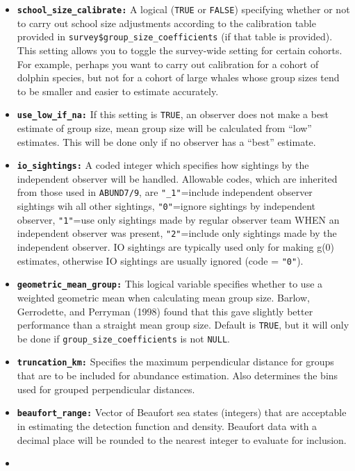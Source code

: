 \documentclass[
]{book}
\begin{document}
\begin{itemize}
\item
  \textbf{\texttt{school\_size\_calibrate:}} A logical (\texttt{TRUE} or \texttt{FALSE}) specifying whether or not to carry out school size adjustments according to the calibration table provided in \texttt{survey\$group\_size\_coefficients} (if that table is provided). This setting allows you to toggle the survey-wide setting for certain cohorts. For example, perhaps you want to carry out calibration for a cohort of dolphin species, but not for a cohort of large whales whose group sizes tend to be smaller and easier to estimate accurately.
\item
  \textbf{\texttt{use\_low\_if\_na:}} If this setting is \texttt{TRUE}, an observer does not make a best estimate of group size, mean group size will be calculated from ``low'' estimates. This will be done only if no observer has a ``best'' estimate.
\item
  \textbf{\texttt{io\_sightings:}} A coded integer which specifies how sightings by the independent observer will be handled. Allowable codes, which are inherited from those used in \texttt{ABUND7/9}, are \texttt{"\_1"}=include independent observer sightings wih all other sightings, \texttt{"0"}=ignore sightings by independent observer, \texttt{"1"}=use only sightings made by regular observer team WHEN an independent observer was present, \texttt{"2"}=include only sightings made by the independent observer. IO sightings are typically used only for making g(0) estimates, otherwise IO sightings are usually ignored (code = \texttt{"0"}).
\item
  \textbf{\texttt{geometric\_mean\_group:}} This logical variable specifies whether to use a weighted geometric mean when calculating mean group size. Barlow, Gerrodette, and Perryman (1998) found that this gave slightly better performance than a straight mean group size. Default is \texttt{TRUE}, but it will only be done if \texttt{group\_size\_coefficients} is not \texttt{NULL}.
\item
  \textbf{\texttt{truncation\_km:}} Specifies the maximum perpendicular distance for groups that are to be included for abundance estimation. Also determines the bins used for grouped perpendicular distances.
\item
  \textbf{\texttt{beaufort\_range:}} Vector of Beaufort sea states (integers) that are acceptable in estimating the detection function and density. Beaufort data with a decimal place will be rounded to the nearest integer to evaluate for inclusion.
\item

\end{itemize}
\end{document}
